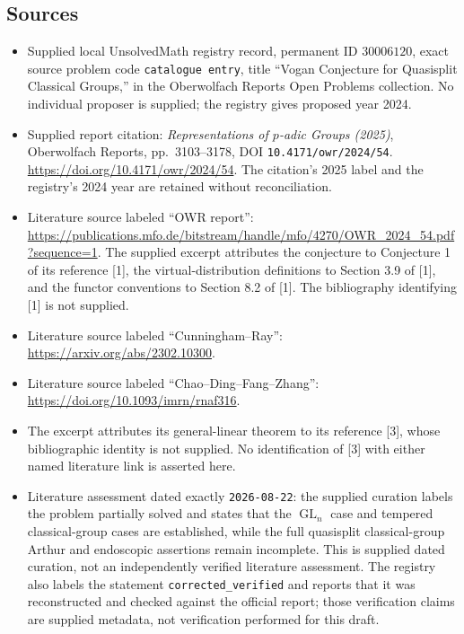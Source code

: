\documentclass[11pt]{article}
\begin{document}
\subsection{Sources}
\begin{itemize}
\item Supplied local UnsolvedMath registry record, permanent ID \(30006120\), exact source problem code \texttt{catalogue entry}, title ``Vogan Conjecture for Quasisplit Classical Groups,'' in the Oberwolfach Reports Open Problems collection. No individual proposer is supplied; the registry gives proposed year 2024.
\item Supplied report citation: \emph{Representations of \(p\)-adic Groups (2025)}, Oberwolfach Reports, pp.\ 3103--3178, DOI \texttt{10.4171/owr/2024/54}. \url{https://doi.org/10.4171/owr/2024/54}. The citation's 2025 label and the registry's 2024 year are retained without reconciliation.
\item Literature source labeled ``OWR report'': \url{https://publications.mfo.de/bitstream/handle/mfo/4270/OWR_2024_54.pdf?sequence=1}. The supplied excerpt attributes the conjecture to Conjecture 1 of its reference [1], the virtual-distribution definitions to Section 3.9 of [1], and the functor conventions to Section 8.2 of [1]. The bibliography identifying [1] is not supplied.
\item Literature source labeled ``Cunningham--Ray'': \url{https://arxiv.org/abs/2302.10300}.
\item Literature source labeled ``Chao--Ding--Fang--Zhang'': \url{https://doi.org/10.1093/imrn/rnaf316}.
\item The excerpt attributes its general-linear theorem to its reference [3], whose bibliographic identity is not supplied. No identification of [3] with either named literature link is asserted here.
\item Literature assessment dated exactly \texttt{2026-08-22}: the supplied curation labels the problem partially solved and states that the \(\operatorname{GL}_n\) case and tempered classical-group cases are established, while the full quasisplit classical-group Arthur and endoscopic assertions remain incomplete. This is supplied dated curation, not an independently verified literature assessment. The registry also labels the statement \texttt{corrected\_verified} and reports that it was reconstructed and checked against the official report; those verification claims are supplied metadata, not verification performed for this draft.
\end{itemize}
\end{document}
